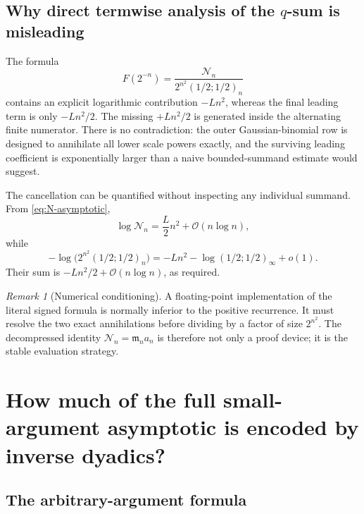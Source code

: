 \documentclass[11pt,oneside]{article}
\theoremstyle{definition}
\theoremstyle{remark}
\newtheorem{remark}[theorem]{Remark}
\newcommand{\bigO}{\mathcal O}
\newcommand{\smallo}{o}
\newcommand{\M}{\mathfrak m}
\begin{document}
\subsection{Why direct termwise analysis of the \texorpdfstring{$q$}{q}-sum is misleading}

The formula
\begin{equation*}
 F(2^{-n})=\frac{\mathcal N_n}{2^{n^2}(1/2;1/2)_n}
\end{equation*}
contains an explicit logarithmic contribution $-Ln^2$, whereas the final leading term is only
$-Ln^2/2$.  The missing $+Ln^2/2$ is generated inside the alternating finite numerator.
There is no contradiction: the outer Gaussian-binomial row is designed to annihilate all
lower scale powers exactly, and the surviving leading coefficient is exponentially larger
than a naive bounded-summand estimate would suggest.

The cancellation can be quantified without inspecting any individual summand.  From
\eqref{eq:N-asymptotic},
\begin{equation}
 \log\mathcal N_n=\frac L2n^2+\bigO(n\log n),               \label{eq:N-leading}
\end{equation}
while
\begin{equation}
 -\log\bigl(2^{n^2}(1/2;1/2)_n\bigr)
 =-Ln^2-\log(1/2;1/2)_\infty+\smallo(1).                   \label{eq:q-den-leading}
\end{equation}
Their sum is $-Ln^2/2+\bigO(n\log n)$, as required.

\begin{remark}[Numerical conditioning]
A floating-point implementation of the literal signed formula is normally inferior to the
positive recurrence.  It must resolve the two exact annihilations before dividing by a factor
of size $2^{n^2}$.  The decompressed identity $\mathcal N_n=\M_na_n$ is therefore not only a
proof device; it is the stable evaluation strategy.
\end{remark}

\section{How much of the full small-argument asymptotic is encoded by inverse dyadics?}
\label{sec:general-x}

\subsection{The arbitrary-argument formula}
\end{document}
